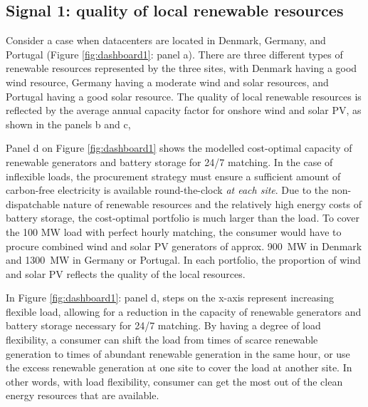 %

\lipsum[1]


\subsection{Signal 1: quality of local renewable resources}

Consider a case when datacenters are located in Denmark, Germany, and Portugal (Figure \ref{fig:dashboard1}: panel a). There are three different types of renewable resources represented by the three sites, with Denmark having a good wind resource, Germany having a moderate wind and solar resources, and Portugal having a good solar resource. The quality of local renewable resources is reflected by the average annual capacity factor for onshore wind and solar PV, as shown in the panels b and c,

Panel d on Figure \ref{fig:dashboard1} shows the modelled cost-optimal capacity of renewable generators and battery storage for 24/7 matching. In the case of inflexible loads, the procurement strategy must ensure a sufficient amount of carbon-free electricity is available round-the-clock \textit{at each site}. Due to the non-dispatchable nature of renewable resources and the relatively high energy costs of battery storage, the cost-optimal portfolio is much larger than the load. To cover the 100 MW load with perfect hourly matching, the consumer would have to procure combined wind and solar PV generators of approx. 900~MW in Denmark and 1300~MW in Germany or Portugal. In each portfolio, the proportion of wind and solar PV reflects the quality of the local resources. 

In Figure \ref{fig:dashboard1}: panel d, steps on the x-axis represent increasing flexible load, allowing for a reduction in the capacity of renewable generators and battery storage necessary for 24/7 matching. By having a degree of load flexibility, a consumer can shift the load from times of scarce renewable generation to times of abundant renewable generation in the same hour, or use the excess renewable generation at one site to cover the load at another site. In other words, with load flexibility, consumer can get the most out of the clean energy resources that are available.

